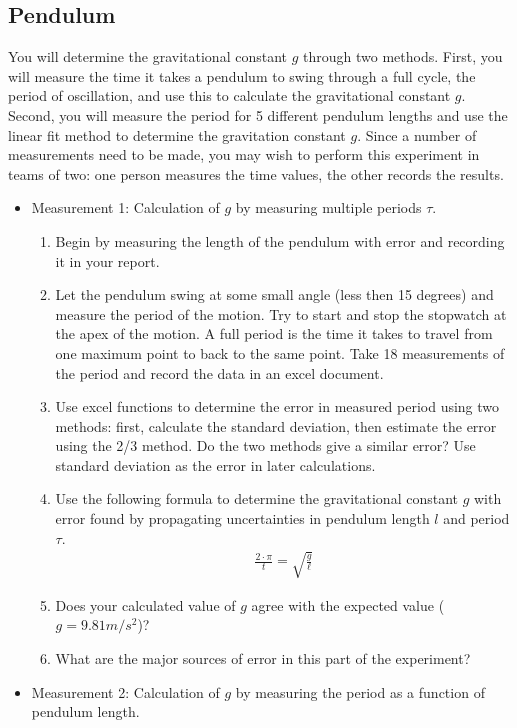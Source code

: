 \subsection{Pendulum}

You will determine the gravitational constant $g$ through two methods. First, you will measure the time it takes a pendulum to swing through a full cycle, the period of oscillation, and use this to calculate the gravitational constant $g$. Second, you will measure the period for 5 different pendulum lengths and use the linear fit method to determine the gravitation constant $g$. Since a number of measurements need to be made, you may wish to perform this experiment in teams of two: one person measures the time values, the other records the results. \myskip

\begin{itemize}
\item Measurement 1: Calculation of $g$ by measuring multiple periods $\tau$.
\begin{enumerate}
\item Begin by measuring the length of the pendulum with error and recording it in your report.
\item Let the pendulum swing at some small angle (less then 15 degrees) and measure the period of the motion. Try to start and stop the stopwatch at the apex of the motion. A full period is the time it takes to travel from one maximum point to back to the same point. Take 18 measurements of the period and record the data in an excel document.
\item Use excel functions to determine the error in measured period using two methods: first, calculate the standard deviation, then estimate the error using the 2/3 method. Do the two methods give a similar error? Use standard deviation as the error in later calculations.
\item Use the following formula to determine the gravitational constant $g$ with error found by propagating uncertainties in pendulum length $l$ and period $\tau$.
\begin{gather}
 \frac{2\cdot \pi}{t} = \sqrt{\frac{g}{\ell}}
\end{gather}
\item Does your calculated value of $g$ agree with the expected value ($g=9.81 m/s^2$)?
\item What are the major sources of error in this part of the experiment?
\end{enumerate}
\item Measurement 2: Calculation of $g$ by measuring the period as a function of pendulum length.

\end{itemize}
